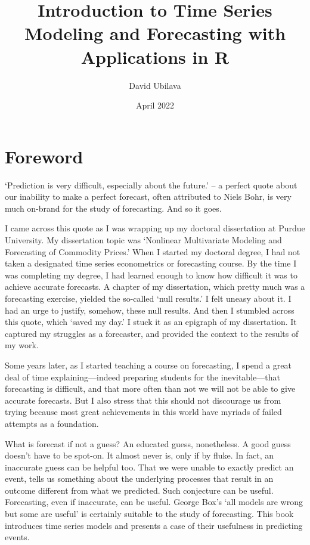 \documentclass[
  12pt,
  oneside]{book}
\title{Introduction to Time Series Modeling and Forecasting with Applications in R}
\author{David Ubilava}
\date{April 2022}
\begin{document}
\maketitle

{
\setcounter{tocdepth}{1}
\tableofcontents
}
\hypertarget{foreword}{%
\chapter*{Foreword}\label{foreword}}

`Prediction is very difficult, especially about the future.' -- a perfect quote about our inability to make a perfect forecast, often attributed to Niels Bohr, is very much on-brand for the study of forecasting. And so it goes.

I came across this quote as I was wrapping up my doctoral dissertation at Purdue University. My dissertation topic was `Nonlinear Multivariate Modeling and Forecasting of Commodity Prices.' When I started my doctoral degree, I had not taken a designated time series econometrics or forecasting course. By the time I was completing my degree, I had learned enough to know how difficult it was to achieve accurate forecasts. A chapter of my dissertation, which pretty much was a forecasting exercise, yielded the so-called `null results.' I felt uneasy about it. I had an urge to justify, somehow, these null results. And then I stumbled across this quote, which `saved my day.' I stuck it as an epigraph of my dissertation. It captured my struggles as a forecaster, and provided the context to the results of my work.

Some years later, as I started teaching a course on forecasting, I spend a great deal of time explaining---indeed preparing students for the inevitable---that forecasting is difficult, and that more often than not we will not be able to give accurate forecasts. But I also stress that this should not discourage us from trying because most great achievements in this world have myriads of failed attempts as a foundation.

What is forecast if not a guess? An educated guess, nonetheless. A good guess doesn't have to be spot-on. It almost never is, only if by fluke. In fact, an inaccurate guess can be helpful too. That we were unable to exactly predict an event, tells us something about the underlying processes that result in an outcome different from what we predicted. Such conjecture can be useful. Forecasting, even if inaccurate, can be useful. George Box's `all models are wrong but some are useful' is certainly suitable to the study of forecasting. This book introduces time series models and presents a case of their usefulness in predicting events.
\end{document}
